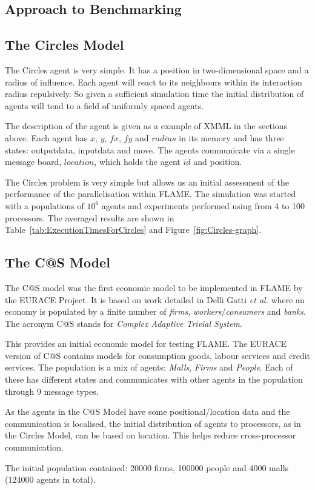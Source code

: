 \subsection{Approach to Benchmarking}
\subsection{The Circles Model}
The Circles agent is very simple. It has a position in two-dimensional space and a radius of influence. Each agent will react to its neighbours within its interaction radius repulsively. So given a sufficient simulation time the initial distribution of agents will tend to a field of uniformly spaced agents.

The description of the agent is given as a example of XMML in the sections above. Each agent has $x$, $y$, $fx$, $fy$ and $radius$ in its memory and has three states: outputdata, inputdata and move. The agents communicate via a single message board, $location$, which holds the agent $id$ and position.

The Circles problem is very simple but allows us an initial assessment of the performance of the parallelisation within FLAME. The simulation was started with a populations of $10^6$  agents and experiments performed using from 4 to 100 processors. The averaged results are shown in Table~\ref{tab:ExecutionTimesForCircles} and Figure~\ref{fig:Circles-graph}.
\subsection{The C@S Model}
The C@S model was the first economic model to be implemented in FLAME by the EURACE Project.  It is based on work detailed in Delli Gatti \textsl{et al.} \cite{Delli Gatti} where an economy is populated by a finite number of \textsl{firms}, \textsl{workers}/\textsl{consumers} and \textsl{banks}. The acronym C@S stands for \textsl{Complex Adaptive Trivial System}.

This provides an initial economic model for testing FLAME. The EURACE version of C@S contains models for consumption goods, labour services and credit services. The population is a mix of agents: \textsl{Malls}, \textsl{Firms} and \textsl{People}. Each of these has different states and communicates with other agents in the population through 9 message types.

As the agents in the C@S Model have some positional/location data and the communication is localised, the initial distribution of agents to processors, as in the Circles Model, can be based on location. This helps reduce cross-processor communication.

The initial population contained: 20000 firms, 100000 people and 4000 malls (124000 agents in total).